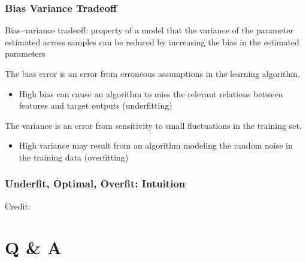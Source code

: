 \documentclass{beamer}
\newenvironment{wideitemize}{\itemize\addtolength{\itemsep}{10pt}}{\enditemize}
\begin{document}
  
  
  \begin{frame}
    \frametitle{Bias Variance Tradeoff}

    \begin{wideitemize}
    \item Bias–variance tradeoff: property of a model that the variance of the parameter estimated across samples can be reduced by increasing the bias in the estimated parameters
      
    \item The bias error is an error from erroneous assumptions in the learning algorithm.
      \begin{itemize}
      \item High bias can cause an algorithm to miss the relevant relations between features and target outputs (underfitting)
      \end{itemize}

        
    \item The variance is an error from sensitivity to small fluctuations in the training set.
      \begin{itemize}
      \item High variance may result from an algorithm modeling the random noise in the training data (overfitting)
      \end{itemize}             
    \end{wideitemize}
      
  \end{frame}

  
\begin{frame}
  \frametitle{Underfit, Optimal, Overfit: Intuition}
  \hspace*{15pt}\hbox{\scriptsize Credit:}
\end{frame}

 \section{Q \& A}
\end{document}
